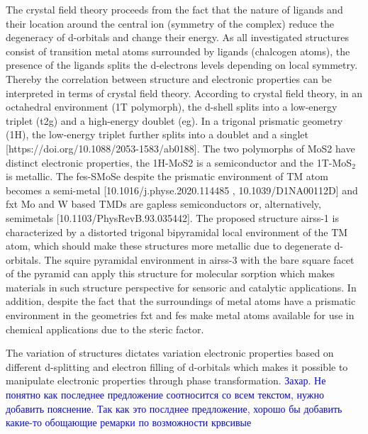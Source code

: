 \documentclass[a4paperm]{article}
\begin{document}
The crystal field theory proceeds from the fact that the nature of ligands and their location around the central ion (symmetry of the complex) reduce the degeneracy of d-orbitals and change their energy. As all investigated structures consist of transition metal atoms surrounded by ligands (chalcogen atoms), the presence of the ligands splits the d-electrons levels depending on local symmetry. Thereby the correlation between structure and electronic properties can be interpreted in terms of crystal field theory. According to crystal field theory, in an octahedral environment (1T polymorph), the d-shell splits into a low-energy triplet (t2g) and a high-energy doublet (eg). In a trigonal prismatic geometry (1H), the low-energy triplet further splits into a doublet and a singlet [https://doi.org/10.1088/2053-1583/ab0188]. The two polymorphs of MoS2 have distinct electronic properties, the 1H-MoS2 is a semiconductor and the 1T-MoS$_2$ is metallic. The fes-SMoSe despite the prismatic environment of TM atom becomes a semi-metal [10.1016/j.physe.2020.114485 , 10.1039/D1NA00112D] and fxt Mo and W based TMDs are gapless semiconductors or, alternatively, semimetals [10.1103/PhysRevB.93.035442]. The proposed structure airss-1 is characterized by a distorted trigonal bipyramidal local environment of the TM atom, which should make these structures more metallic due to degenerate d-orbitals. The squire pyramidal environment in airss-3 with the bare square facet of the pyramid can apply this structure for molecular sorption which makes materials in such structure perspective for sensoric and catalytic applications. In addition, despite the fact that the surroundings of metal atoms have a prismatic environment in the geometries fxt and fes make metal atoms available for use in chemical applications due to the steric factor.

The variation of structures dictates variation electronic properties based on different d-splitting and electron filling of d-orbitals which makes it possible to manipulate electronic properties through phase transformation.
\textcolor{blue}{Захар. Не понятно как последнее предложение соотносится со всем текстом, нужно добавить пояснение. Так как это послднее предложение, хорошо бы добавить какие-то обощающие ремарки по возможности крвсивые}




\end{document}
